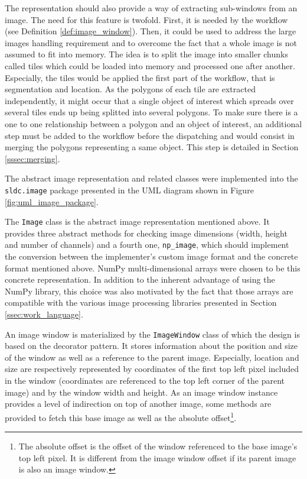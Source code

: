 The representation should also provide a way of extracting sub-windows from an image. The need for this feature is twofold. First, it is needed by the workflow (see Definition \ref{def:image_window}). Then, it could be used to address the large images handling requirement and to overcome the fact that a whole image is not assumed to fit into memory. The idea is to split the image into smaller chunks called tiles which could be loaded into memory and processed one after another. Especially, the tiles would be applied the first part of the workflow, that is segmentation and location. As the polygons of each tile are extracted independently, it might occur that a single object of interest which spreads over several tiles ends up being splitted into several polygons. To make sure there is a one to one relationship between a polygon and an object of interest, an additional step must be added to the workflow before the dispatching and would consist in merging the polygons representing a same object. This step is detailed in Section \ref{sssec:merging}.

The abstract image representation and related classes were implemented into the \texttt{sldc.image} package presented in the UML diagram shown in Figure \ref{fig:uml_image_package}.

The \texttt{Image} class is the abstract image representation mentioned above. It provides three abstract methods for checking image dimensions (width, height and number of channels) and a fourth one, \texttt{np\_image}, which should implement the conversion between the implementer's custom image format and the concrete format mentioned above. NumPy multi-dimensional arrays were chosen to be this concrete representation. In addition to the inherent advantage of using the NumPy library, this choice was also motivated by the fact that those arrays are compatible with the various image processing libraries presented in Section \ref{ssec:work_language}. 

An image window is materialized by the \texttt{ImageWindow} class of which the design is based on the decorator pattern. It stores information about the position and size of the window as well as a reference to the parent image. Especially, location and size are respectively represented by coordinates of the first top left pixel included in the window (coordinates are referenced to the top left corner of the parent image) and by the window width and height. As an image window instance provides a level of indirection on top of another image, some methods are provided to fetch this base image as well as the absolute offset\footnote{The absolute offset is the offset of the window referenced to the base image's top left pixel. It is different from the image window offset if its parent image is also an image window.}.

